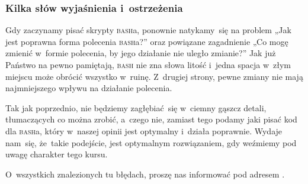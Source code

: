 \documentclass[10pt,t]{beamer}
\begin{document}
\begin{frame}
  \frametitle{Kilka słów wyjaśnienia i~ostrzeżenia}


  Gdy zaczynamy pisać skrypty \textsc{bash}a, ponownie natykamy~się na
  problem „Jak jest poprawna forma polecenia \textsc{bash}a?” oraz powiązane
  zagadnienie „Co mogę zmienić w~formie polecenia, by jego działanie nie
  uległo zmianie?” Jak już Państwo na pewno pamiętają, \textsc{bash} nie
  zna słowa litość i~jedna spacja w~złym miejscu może obrócić wszystko
  w~ruinę. Z~drugiej strony, pewne zmiany nie mają najmniejszego wpływu
  na działanie polecenia.

  Tak jak poprzednio, nie będziemy zagłębiać~się w~ciemny gąszcz detali,
  tłumaczących co można zrobić, a~czego nie, zamiast tego podamy jaki
  pisać kod dla \textsc{bash}a, który w~naszej opinii jest optymalny
  i~działa poprawnie. Wydaje nam~się, że~takie podejście, jest optymalnym
  rozwiązaniem, gdy weźmiemy pod uwagę charakter tego kursu.

  O~wszystkich znalezionych tu błędach, proszę nas informować pod adresem
  \email.

\end{frame}
























\end{document}
